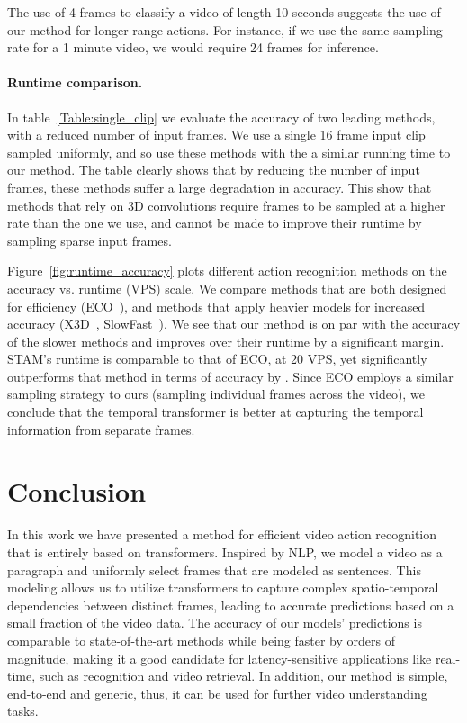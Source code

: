 \documentclass[10pt,twocolumn,letterpaper]{article}
\begin{document}
The use of 4 frames to classify a video of length 10 seconds suggests the use of our method for longer range actions.  For instance, if we use the same sampling rate for a 1 minute video, we would require 24 frames for inference. 


\paragraph{Runtime comparison.}  In table~\ref{Table:single_clip} we evaluate the accuracy of two leading methods, with a reduced number of input frames.  We use a single 16 frame input clip sampled uniformly, and so use these methods with the a similar running time to our method.  The table clearly shows that by reducing the number of input frames, these methods suffer a large degradation in accuracy.  This show that methods that rely on 3D convolutions require frames to be sampled at a higher rate than the one we use, and cannot be made to improve their runtime by sampling sparse input frames.  

Figure~\ref{fig:runtime_accuracy} plots different action recognition methods on the accuracy vs. runtime (VPS) scale.  We compare methods that are both designed for efficiency (ECO~\cite{zolfaghari2018eco}), and methods that apply heavier models for increased accuracy (X3D~\cite{feichtenhofer2020x3d}, SlowFast~\cite{feichtenhofer2019slowfast}).  We see that our method is on par with the accuracy of the slower methods and improves over their runtime by a significant margin.  STAM's runtime is comparable to that of ECO, at 20 VPS, yet significantly outperforms that method in terms of accuracy by .  Since ECO employs a similar sampling strategy to ours (sampling individual frames across the video), we conclude that the temporal transformer is better at capturing the temporal information from separate frames.












\section{Conclusion}
In this work we have presented a method for efficient video action recognition that is entirely based on transformers. Inspired by NLP, we model a video as a paragraph and uniformly select frames that are modeled as sentences. This modeling allows us to utilize transformers to capture complex spatio-temporal dependencies between distinct frames, leading to accurate predictions based on a small fraction of the video data. 
The accuracy of our models' predictions is comparable to state-of-the-art methods while being faster by orders of magnitude, making it a good candidate for latency-sensitive applications like real-time, such as recognition and video retrieval.
In addition, our method is simple, end-to-end and generic, thus, it can be used for further video understanding tasks.
\end{document}
